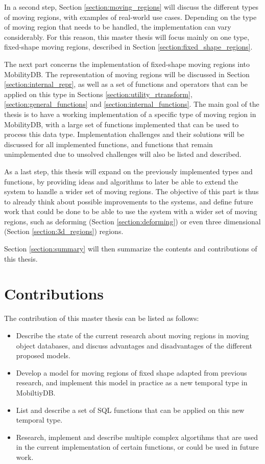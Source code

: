 In a second step, Section \ref{section:moving_regions} will discuss the different types of moving regions, with examples of real-world use cases. Depending on the type of moving region that needs to be handled, the implementation can vary considerably. For this reason, this master thesis will focus mainly on one type, fixed-shape moving regions, described in Section \ref{section:fixed_shape_regions}.

The next part concerns the implementation of fixed-shape moving regions into MobilityDB. The representation of moving regions will be discussed in Section \ref{section:internal_repr}, as well as a set of functions and operators that can be applied on this type in Sections \ref{section:utility_rtransform}, \ref{section:general_functions} and \ref{section:internal_functions}. The main goal of the thesis is to have a working implementation of a specific type of moving region in MobilityDB, with a large set of functions implemented that can be used to process this data type. Implementation challenges and their solutions will be discussed for all implemented functions, and functions that remain unimplemented due to unsolved challenges will also be listed and described.

As a last step, this thesis will expand on the previously implemented types and functions, by providing ideas and algorithms to later be able to extend the system to handle a wider set of moving regions. The objective of this part is thus to already think about possible improvements to the systems, and define future work that could be done to be able to use the system with a wider set of moving regions, such as deforming (Section \ref{section:deforming}) or even three dimensional (Section \ref{section:3d_regions}) regions.

Section \ref{section:summary} will then summarize the contents and contributions of this thesis.

\section{Contributions}

The contribution of this master thesis can be listed as follows:

\begin{itemize}
    \item Describe the state of the current research about moving regions in moving object databases, and discuss advantages and disadvantages of the different proposed models.
    \item Develop a model for moving regions of fixed shape adapted from previous research, and implement this model in practice as a new temporal type in MobiltiyDB.
    \item List and describe a set of SQL functions that can be applied on this new temporal type.
    \item Research, implement and describe multiple complex algortihms that are used in the current implementation of certain functions, or could be used in future work.
\end{itemize}

